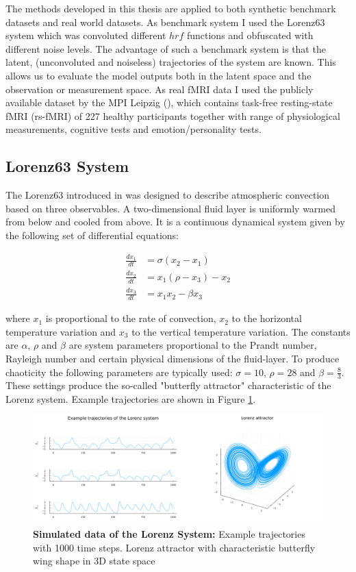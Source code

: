 The methods developed in this thesis are applied to both synthetic benchmark datasets and real world datasets. As benchmark system I used the Lorenz63 system which 
was convoluted different $hrf$ functions and obfuscated with different noise levels. The advantage of such a benchmark system is that the latent, 
(unconvoluted and noiseless) trajectories of the system are known. This allows us to evaluate the model outputs both in the latent space and the observation or 
measurement space. As real fMRI data I used the publicly available dataset by the MPI Leipzig (\cite{babayan2019mind}), which contains task-free 
resting-state fMRI (rs-fMRI) of 227 healthy participants together with range of physiological measurements, cognitive tests and emotion/personality tests.

\subsection{Lorenz63 System}

The Lorenz63 introduced in \cite{lorenz1963deterministic} was designed to describe atmospheric convection based on three observables. A two-dimensional fluid layer is 
uniformly warmed from below and cooled from above. It is a continuous dynamical system given by the following set of differential equations:

\begin{align}
    \frac{dx_1}{dt} &= \sigma (x_2 - x_1) \\
    \frac{dx_2}{dt} &= x_1 (\rho - x_3) - x_2 \\
    \frac{dx_3}{dt} &= x_1 x_2 - \beta x_3  
\end{align}

where $x_1$ is proportional to the rate of convection, $x_2$ to the horizontal temperature variation and $x_3$ to the vertical temperature variation. The constants 
are $\alpha$, $\rho$ and $\beta$ are system parameters proportional to the Prandt number, Rayleigh number and certain physical dimensions of the fluid-layer. To produce 
chaoticity the following parameters are typically used: $\sigma=10$, $\rho=28$ and $\beta = \frac{8}{3}$. These settings produce the so-called "butterfly attractor" 
characteristic of the Lorenz system. Example trajectories are shown in Figure \ref{fig:lorenz_system}.

\begin{figure}
    \includegraphics[width=\textwidth]{Images/lorenz_system.png}
    \caption[Simulated data of the Lorenz System]{\textbf{Simulated data of the Lorenz System: } Example trajectories with 1000 time steps. 
    Lorenz attractor with characteristic butterfly wing shape in 3D state space}
    \label{fig:lorenz_system}
\end{figure}

